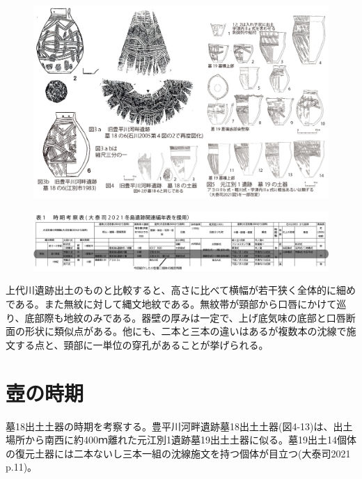 \documentclass[a4j,11pt,twocolumn,openany]{jsbook}
\begin{document}
\begin{figure}[ht]
	\centering
	\includegraphics[width=160truemm]{fig/03_Otaishi/02_otaishi.jpg}
	\label{}
	\vspace{-1\baselineskip}
\end{figure}

\begin{figure}[ht]
	\centering
	\includegraphics[width=160truemm]{fig/03_Otaishi/03_otaishi.jpg}
	\label{}
	\vspace{-1\baselineskip}
\end{figure}

上代川遺跡出土のものと比較すると、高さに比べて横幅が若干狭く全体的に細めである。また無紋に対して縄文地紋である。無紋帯が頸部から口唇にかけて巡り、底部際も地紋のみである。器壁の厚みは一定で、上げ底気味の底部と口唇断面の形状に類似点がある。他にも、二本と三本の違いはあるが複数本の沈線で施文する点と、頸部に一単位の穿孔があることが挙げられる。

\section{壺の時期}
墓18出土土器の時期を考察する。豊平川河畔遺跡墓18出土土器(図4-13)は、出土場所から南西に約400ｍ離れた元江別1遺跡墓19出土土器に似る。墓19出土14個体の復元土器には二本ないし三本一組の沈線施文を持つ個体が目立つ(大泰司2021 p.11)。
\end{document}
